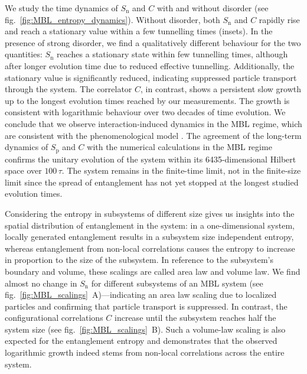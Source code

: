 We study the time dynamics of $S_\text{n}$ and $C$ with and without disorder (see fig.~\ref{fig:MBL_entropy_dynamics}). Without disorder, both $S_\text{n}$ and $C$ rapidly rise and reach a stationary value within a few tunnelling times (insets). In the presence of strong disorder, we find a qualitatively different behaviour for the two quantities: $S_\text{n}$ reaches a stationary state within few tunnelling times, although after longer evolution time due to reduced effective tunnelling. Additionally, the stationary value is significantly reduced, indicating suppressed particle transport through the system. The correlator $C$, in contrast, shows a persistent slow growth up to the longest evolution times reached by our measurements. The growth is consistent with logarithmic behaviour over two decades of time evolution. We conclude that we observe interaction-induced dynamics in the MBL regime, which are consistent with the phenomenological model \cite{Serbyn2013, Serbyn2013a, Huse2014}. The agreement of the long-term dynamics of $S_\text{p}$ and $C$ with the numerical calculations in the MBL regime confirms the unitary evolution of the system within its 6435-dimensional Hilbert space over $100\,\tau$. The system remains in the finite-time limit, not in the finite-size limit since the spread of entanglement has not yet stopped at the longest studied evolution times. 

Considering the entropy in subsystems of different size gives us insights into the spatial distribution of entanglement in the system: in a one-dimensional system, locally generated entanglement results in a subsystem size independent entropy, whereas entanglement from non-local correlations causes the entropy to increase in proportion to the size of the subsystem. In reference to the subsystem's boundary and volume, these scalings are called area law and volume law. We find almost no change in $S_\text{n}$ for different subsystems of an MBL system (see fig.~\ref{fig:MBL_scalings}~A)---indicating an area law scaling due to localized particles and confirming that particle transport is suppressed. In contrast, the configurational correlations $C$ increase until the subsystem reaches half the system size (see fig.~\ref{fig:MBL_scalings}~B). Such a volume-law scaling is also expected for the entanglement entropy and demonstrates that the observed logarithmic growth indeed stems from non-local correlations across the entire system.

